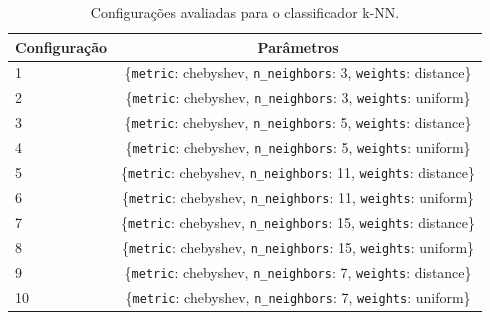 \documentclass[12pt]{article}
\begin{document}
\begin{table}[H]
\centering
\caption{Configurações avaliadas para o classificador k-NN.}
\label{tab:knn-config}
\begin{tabular}{lc}
\toprule
\textbf{Configuração} & \textbf{Parâmetros} \\
\midrule
1 & \{\texttt{metric}: chebyshev, \texttt{n\_neighbors}: 3, \texttt{weights}: distance\} \\
2 & \{\texttt{metric}: chebyshev, \texttt{n\_neighbors}: 3, \texttt{weights}: uniform\} \\
3 & \{\texttt{metric}: chebyshev, \texttt{n\_neighbors}: 5, \texttt{weights}: distance\} \\
4 & \{\texttt{metric}: chebyshev, \texttt{n\_neighbors}: 5, \texttt{weights}: uniform\} \\
5 & \{\texttt{metric}: chebyshev, \texttt{n\_neighbors}: 11, \texttt{weights}: distance\} \\
6 & \{\texttt{metric}: chebyshev, \texttt{n\_neighbors}: 11, \texttt{weights}: uniform\} \\
7 & \{\texttt{metric}: chebyshev, \texttt{n\_neighbors}: 15, \texttt{weights}: distance\} \\
8 & \{\texttt{metric}: chebyshev, \texttt{n\_neighbors}: 15, \texttt{weights}: uniform\} \\
9 & \{\texttt{metric}: chebyshev, \texttt{n\_neighbors}: 7, \texttt{weights}: distance\} \\
10 & \{\texttt{metric}: chebyshev, \texttt{n\_neighbors}: 7, \texttt{weights}: uniform\} \\
\bottomrule
\end{tabular}
\end{table}
\end{document}

